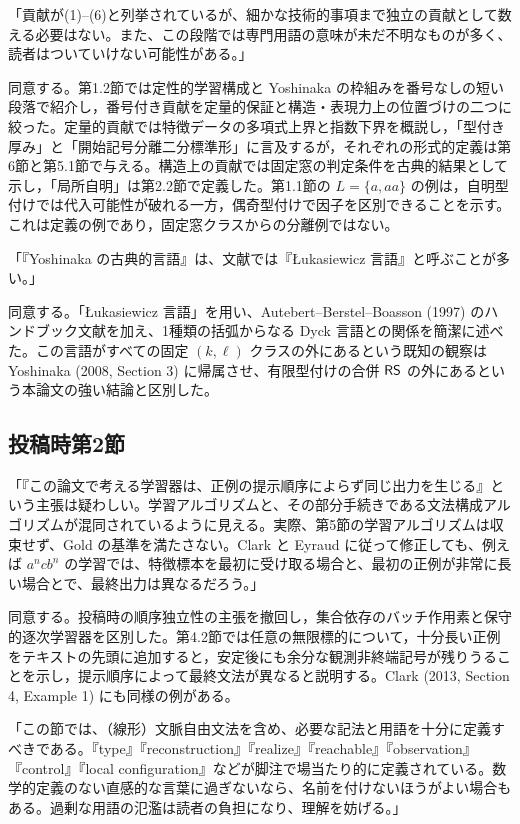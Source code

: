 「貢献が(1)--(6)と列挙されているが、細かな技術的事項まで独立の貢献として数える必要はない。また、この段階では専門用語の意味が未だ不明なものが多く、読者はついていけない可能性がある。」

\Reply
同意する。第1.2節では定性的学習構成と Yoshinaka の枠組みを番号なしの短い段落で紹介し，番号付き貢献を定量的保証と構造・表現力上の位置づけの二つに絞った。定量的貢献では特徴データの多項式上界と指数下界を概説し，「型付き厚み」と「開始記号分離二分標準形」に言及するが，それぞれの形式的定義は第6節と第5.1節で与える。構造上の貢献では固定窓の判定条件を古典的結果として示し，「局所自明」は第2.2節で定義した。第1.1節の $L=\{a,aa\}$ の例は，自明型付けでは代入可能性が破れる一方，偶奇型付けで因子を区別できることを示す。これは定義の例であり，固定窓クラスからの分離例ではない。

「『Yoshinaka の古典的言語』は、文献では『Łukasiewicz 言語』と呼ぶことが多い。」

\Reply
同意する。「Łukasiewicz 言語」を用い、Autebert--Berstel--Boasson (1997) のハンドブック文献を加え、1種類の括弧からなる Dyck 言語との関係を簡潔に述べた。この言語がすべての固定 $(k,\ell)$ クラスの外にあるという既知の観察は Yoshinaka (2008, Section 3) に帰属させ、有限型付けの合併 $\mathsf{RS}$ の外にあるという本論文の強い結論と区別した。

\subsection*{投稿時第2節}
「『この論文で考える学習器は、正例の提示順序によらず同じ出力を生じる』という主張は疑わしい。学習アルゴリズムと、その部分手続きである文法構成アルゴリズムが混同されているように見える。実際、第5節の学習アルゴリズムは収束せず、Gold の基準を満たさない。Clark と Eyraud に従って修正しても、例えば $a^ncb^n$ の学習では、特徴標本を最初に受け取る場合と、最初の正例が非常に長い場合とで、最終出力は異なるだろう。」

\Reply
同意する。投稿時の順序独立性の主張を撤回し，集合依存のバッチ作用素と保守的逐次学習器を区別した。第4.2節では任意の無限標的について，十分長い正例をテキストの先頭に追加すると，安定後にも余分な観測非終端記号が残りうることを示し，提示順序によって最終文法が異なると説明する。Clark (2013, Section 4, Example 1) にも同様の例がある。

「この節では、（線形）文脈自由文法を含め、必要な記法と用語を十分に定義すべきである。『type』『reconstruction』『realize』『reachable』『observation』『control』『local configuration』などが脚注で場当たり的に定義されている。数学的定義のない直感的な言葉に過ぎないなら、名前を付けないほうがよい場合もある。過剰な用語の氾濫は読者の負担になり、理解を妨げる。」

